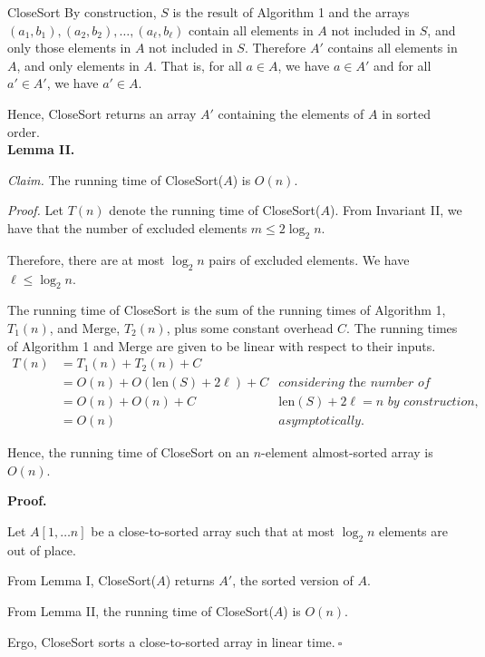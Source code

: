 \begin{enumerate}
\begin{solution}{\sc CloseSort}
By construction, $S$ is the result of Algorithm 1 and the arrays $(a_1,b_1),(a_2,b_2),\dots,(a_\ell,b_\ell)$ contain all 
elements in $A$ not included in $S$, and only those elements in $A$ not included in $S$. Therefore $A'$ contains all elements in $A$, and only elements in $A$. That is, for all $a\in A$, we have $a\in A'$ and for all $a'\in A'$, we have $a'\in A$.

Hence, {\sc CloseSort} returns an array $A'$ containing the elements of $A$ in sorted order.\\

\textbf{Lemma II.}

\textit{Claim. }The running time of {\sc CloseSort}($A$) is $O(n)$.

\textit{Proof. }Let $T(n)$ denote the running time of {\sc CloseSort}($A$). From Invariant II, we have that the number of excluded elements $m\leq 2\log_2n$.

Therefore, there are at most $\log_2n$ pairs of excluded elements. We have $\ell\leq\log_2n$.

The running time of {\sc CloseSort} is the sum of the running times of Algorithm 1, $T_1(n)$, and {\sc Merge}, $T_2(n)$, plus some constant overhead $C$. The running times of Algorithm 1 and {\sc Merge} are given to be linear with respect to their inputs.
\begin{align*}
T(n)&=T_1(n)+T_2(n)+C&~\\
&=O(n)+O(\text{len}(S)+2\ell)+C&\textit{considering the number of elements to merge,}\\
&=O(n)+O(n)+C&\textit{$\text{len}(S)+2\ell=n$ by construction,}\\
&=O(n)&\textit{asymptotically.}
\end{align*}

Hence, the running time of {\sc CloseSort} on an $n$-element almost-sorted array is $O(n)$.

\textbf{Proof.}

Let $A[1,\dots n]$ be a close-to-sorted array such that at most $\log_2n$ elements are out of place.

From Lemma I, {\sc CloseSort}($A$) returns $A'$, the sorted version of $A$. 

From Lemma II, the running time of {\sc CloseSort}($A$) is $O(n)$.

Ergo, {\sc CloseSort} sorts a close-to-sorted array in linear time.$~\square$
\end{solution}
\end{enumerate}

